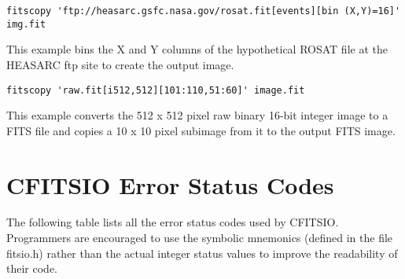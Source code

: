 \documentclass[11pt]{article}
\begin{document}
\begin{verbatim}
fitscopy 'ftp://heasarc.gsfc.nasa.gov/rosat.fit[events][bin (X,Y)=16]' img.fit
\end{verbatim}

This example bins the X and Y columns of the hypothetical ROSAT file 
at the HEASARC ftp site to create the output image.

\begin{verbatim}
fitscopy 'raw.fit[i512,512][101:110,51:60]' image.fit
\end{verbatim}

This example converts the 512 x 512 pixel raw binary 16-bit integer
image to a FITS file and copies a 10 x 10 pixel subimage from it to the
output FITS image.

\newpage
\section{CFITSIO Error Status Codes}

The following table lists all the error status codes used by CFITSIO.
Programmers are encouraged to use the symbolic mnemonics (defined in
the file fitsio.h) rather than the actual integer status values to
improve the readability of their code.
\end{document}
